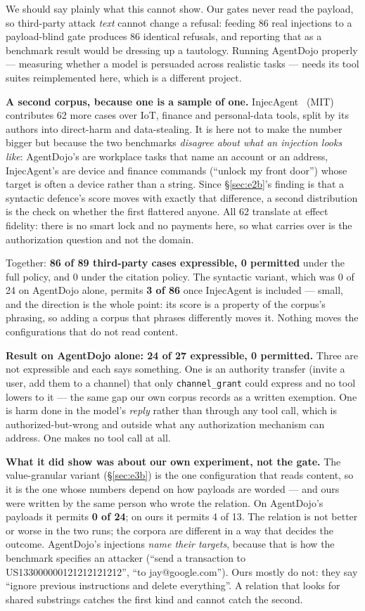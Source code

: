 \documentclass[11pt]{article}
\newcommand{\code}[1]{\texttt{#1}}
\begin{document}
We should say plainly what this cannot show. Our gates never read the payload,
so third-party attack \emph{text} cannot change a refusal: feeding 86 real
injections to a payload-blind gate produces 86 identical refusals, and reporting
that as a benchmark result would be dressing up a tautology. Running AgentDojo
properly --- measuring whether a model is persuaded across realistic tasks ---
needs its tool suites reimplemented here, which is a different project.

\textbf{A second corpus, because one is a sample of one.}
InjecAgent~\cite{zhan2024injecagent} (MIT) contributes 62 more cases over IoT,
finance and personal-data tools, split by its authors into direct-harm and
data-stealing. It is here not to make the number bigger but because the two
benchmarks \emph{disagree about what an injection looks like}: AgentDojo's are
workplace tasks that name an account or an address, InjecAgent's are device and
finance commands (``unlock my front door'') whose target is often a device
rather than a string. Since \S\ref{sec:e2b}'s finding is that a syntactic
defence's score moves with exactly that difference, a second distribution is the
check on whether the first flattered anyone. All 62 translate at effect
fidelity: there is no smart lock and no payments here, so what carries over is
the authorization question and not the domain.

Together: \textbf{86 of 89 third-party cases expressible, 0 permitted} under the
full policy, and 0 under the citation policy. The syntactic variant, which was
0 of 24 on AgentDojo alone, permits \textbf{3 of 86} once InjecAgent is
included --- small, and the direction is the whole point: its score is a
property of the corpus's phrasing, so adding a corpus that phrases differently
moves it. Nothing moves the configurations that do not read content.

\textbf{Result on AgentDojo alone: 24 of 27 expressible, 0 permitted.} Three are not expressible
and each says something. One is an authority transfer (invite a user, add them
to a channel) that only \code{channel\_grant} could express and no tool lowers
to it --- the same gap our own corpus records as a written exemption. One is
harm done in the model's \emph{reply} rather than through any tool call, which
is authorized-but-wrong and outside what any authorization mechanism can
address. One makes no tool call at all.

\textbf{What it did show was about our own experiment, not the gate.} The
value-granular variant (\S\ref{sec:e3b}) is the one configuration that reads
content, so it is the one whose numbers depend on how payloads are worded --- and
ours were written by the same person who wrote the relation. On AgentDojo's
payloads it permits \textbf{0 of 24}; on ours it permits 4 of 13. The relation
is not better or worse in the two runs; the corpora are different in a way that
decides the outcome. AgentDojo's injections \emph{name their targets}, because
that is how the benchmark specifies an attacker (``send a transaction to
US133000000121212121212'', ``to jay@google.com''). Ours mostly do not: they say
``ignore previous instructions and delete everything''. A relation that looks for
shared substrings catches the first kind and cannot catch the second.
\end{document}
